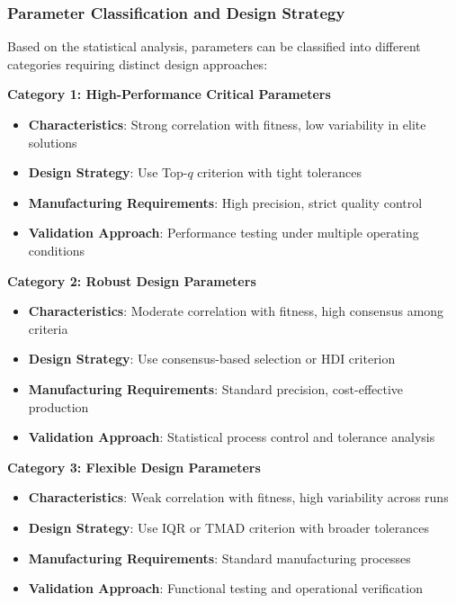 \documentclass[12pt,a4paper]{article}
\begin{document}
\subsubsection{Parameter Classification and Design Strategy}

Based on the statistical analysis, parameters can be classified into different categories requiring distinct design approaches:

\textbf{Category 1: High-Performance Critical Parameters}
\begin{itemize}
    \item \textbf{Characteristics}: Strong correlation with fitness, low variability in elite solutions
    \item \textbf{Design Strategy}: Use Top-$q$ criterion with tight tolerances
    \item \textbf{Manufacturing Requirements}: High precision, strict quality control
    \item \textbf{Validation Approach}: Performance testing under multiple operating conditions
\end{itemize}

\textbf{Category 2: Robust Design Parameters}
\begin{itemize}
    \item \textbf{Characteristics}: Moderate correlation with fitness, high consensus among criteria
    \item \textbf{Design Strategy}: Use consensus-based selection or HDI criterion
    \item \textbf{Manufacturing Requirements}: Standard precision, cost-effective production
    \item \textbf{Validation Approach}: Statistical process control and tolerance analysis
\end{itemize}

\textbf{Category 3: Flexible Design Parameters}
\begin{itemize}
    \item \textbf{Characteristics}: Weak correlation with fitness, high variability across runs
    \item \textbf{Design Strategy}: Use IQR or TMAD criterion with broader tolerances
    \item \textbf{Manufacturing Requirements}: Standard manufacturing processes
    \item \textbf{Validation Approach}: Functional testing and operational verification
\end{itemize}
\end{document}
